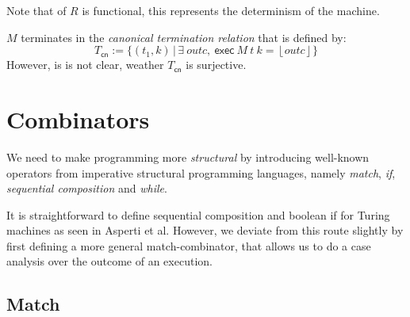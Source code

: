 \documentclass{psartcl}
\newcommand{\MS}[1]{\textsf{#1}}
\newcommand{\setOf}[1]{\bigl \{ #1 \bigr \}}
\newcommand{\setMap}[2]{\setOf{#1 \,\big|\, #2}}
\newcommand{\Some}[1]{\left\lfloor #1\right\rfloor}
\begin{document}
Note that of $R$ is functional, this represents the determinism of the machine.

\begin{lemma}
  \label{lem:canonical-term-relation}
  $M$ terminates in the \emph{canonical termination relation} that is defined by:
  $$T_{\MS{cn}} := \setMap{(t_1, k)}{ \exists~outc,~ \MS{exec}~M~t~k = \Some{outc} }$$
  However, is is not clear, weather $T_{\MS{cn}}$ is surjective.
\end{lemma}

\section{Combinators}
\label{sec:combinators}

We need to make programming more \textit{structural} by introducing well-known operators from imperative structural programming languages, namely
\emph{match}, \emph{if}, \emph{sequential composition} and \emph{while}.

It is straightforward to define sequential composition and boolean if for Turing machines as seen in Asperti et al.
However, we deviate from this route slightly by first defining a more general match-combinator, that allows us to do a case analysis over the outcome
of an execution.

\subsection{Match}
\end{document}
